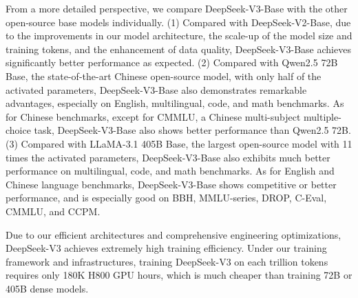 \documentclass[11pt,a4paper]{article}
\begin{document}
From a more detailed perspective, we compare DeepSeek-V3-Base with the other open-source base models individually.
(1) 
Compared with DeepSeek-V2-Base, due to the improvements in our model architecture, the scale-up of the model size and training tokens, and the enhancement of data quality, DeepSeek-V3-Base achieves significantly better performance as expected.
(2)
Compared with Qwen2.5 72B Base, the state-of-the-art Chinese open-source model, with only half of the activated parameters, DeepSeek-V3-Base also demonstrates remarkable advantages, especially on English, multilingual, code, and math benchmarks. 
As for Chinese benchmarks, except for CMMLU, a Chinese multi-subject multiple-choice task, DeepSeek-V3-Base also shows better performance than Qwen2.5 72B. 
(3)
Compared with LLaMA-3.1 405B Base, the largest open-source model with 11 times the activated parameters, DeepSeek-V3-Base also exhibits much better performance on multilingual, code, and math benchmarks. 
As for English and Chinese language benchmarks, DeepSeek-V3-Base shows competitive or better performance, and is especially good on BBH, MMLU-series, DROP, C-Eval, CMMLU, and CCPM.

Due to our efficient architectures and comprehensive engineering optimizations, DeepSeek-V3 achieves extremely high training efficiency. 
Under our training framework and infrastructures, training DeepSeek-V3 on each trillion tokens requires only 180K H800 GPU hours, which is much cheaper than training 72B or 405B dense models.
\end{document}
